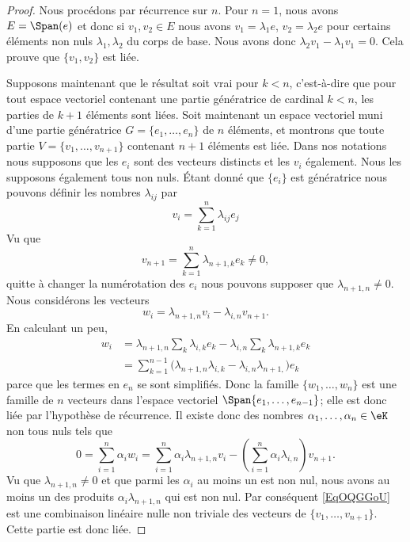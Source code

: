 \begin{proof}
	Nous procédons par récurrence sur \( n\). Pour \( n=1\), nous avons \( E=\Span(e)\) et donc si \( v_1,v_2\in E\) nous avons \( v_1=\lambda_1 e\), \( v_2=\lambda_2e\) pour certains éléments non nuls \( \lambda_1,\lambda_2\) du corps de base. Nous avons donc \( \lambda_2v_1-\lambda_1v_1=0\). Cela prouve que \( \{ v_1,v_2 \}\) est liée.

	Supposons maintenant que le résultat soit vrai pour \( k<n\), c'est-à-dire que pour tout espace vectoriel contenant une partie génératrice de cardinal \( k<n\), les parties de \( k+1\) éléments sont liées. Soit maintenant un espace vectoriel muni d'une partie génératrice \( G=\{ e_1,\ldots, e_n \}\) de \( n\) éléments, et montrons que toute partie \( V=\{ v_1,\ldots, v_{n+1} \}\) contenant \( n+1\) éléments est liée. Dans nos notations nous supposons que les \( e_i\) sont des vecteurs distincts et les \( v_i\) également. Nous les supposons également tous non nuls. Étant donné que \( \{ e_i \}\) est génératrice nous pouvons définir les nombres \( \lambda_{ij}\) par
	\begin{equation}
		v_i=\sum_{k=1}^n\lambda_{ij}e_j
	\end{equation}
	Vu que
	\begin{equation}
		v_{n+1}=\sum_{k=1}^n\lambda_{n+1,k}e_k\neq 0,
	\end{equation}
	quitte à changer la numérotation des \( e_i\) nous pouvons supposer que \( \lambda_{n+1,n}\neq 0\). Nous considérons les vecteurs
	\begin{equation}
		w_i=\lambda_{n+1,n}v_i-\lambda_{i,n}v_{n+1}.
	\end{equation}
	En calculant un peu,
	\begin{subequations}
		\begin{align}
			w_i & =\lambda_{n+1,n}\sum_k\lambda_{i,k}e_k-\lambda_{i,n}\sum_k\lambda_{n+1,k}e_k             \\
			    & =\sum_{k=1}^{n-1}\big( \lambda_{n+1,n}\lambda_{i,k}-\lambda_{i,n}\lambda_{n+1,} \big)e_k
		\end{align}
	\end{subequations}
	parce que les termes en \( e_n\) se sont simplifiés. Donc la famille \( \{ w_1,\ldots, w_n \}\) est une famille de \( n\) vecteurs dans l'espace vectoriel \( \Span\{ e_1,\ldots, e_{n-1} \}\); elle est donc liée par l'hypothèse de récurrence. Il existe donc des nombres \( \alpha_1,\ldots, \alpha_n\in \eK\) non tous nuls tels que
	\begin{equation}        \label{EqOQGGoU}
		0=\sum_{i=1}^n\alpha_iw_i=\sum_{i=1}^n\alpha_i\lambda_{n+1,n}v_i-\left( \sum_{i=1}^n\alpha_i\lambda_{i,n} \right)v_{n+1}.
	\end{equation}
	Vu que \( \lambda_{n+1,n}\neq 0\) et que parmi les \( \alpha_i\) au moins un est non nul, nous avons au moins un des produits \( \alpha_i\lambda_{n+1,n}\) qui est non nul. Par conséquent \eqref{EqOQGGoU} est une combinaison linéaire nulle non triviale des vecteurs de \( \{ v_1,\ldots, v_{n+1} \}\). Cette partie est donc liée.
\end{proof}

